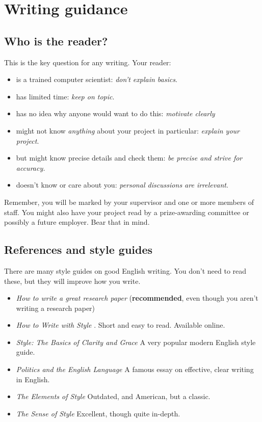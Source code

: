 \documentclass{l4proj}
\theoremstyle{definition}
\begin{document}
\section{Writing guidance}
\subsection{Who is the reader?}

This is the key question for any writing. Your reader:

\begin{itemize}
    \item
    is a trained computer scientist: \emph{don't explain basics}.
    \item
    has limited time: \emph{keep on topic}.
    \item
    has no idea why anyone would want to do this: \emph{motivate clearly}
    \item
    might not know \emph{anything} about your project in particular:
    \emph{explain your project}.
    \item
    but might know precise details and check them: \emph{be precise and
    strive for accuracy.}
    \item
    doesn't know or care about you: \emph{personal discussions are
    irrelevant}.
\end{itemize}

Remember, you will be marked by your supervisor and one or more members
of staff. You might also have your project read by a prize-awarding
committee or possibly a future employer. Bear that in mind.

\subsection{References and style guides}
There are many style guides on good English writing. You don't need to
read these, but they will improve how you write.

\begin{itemize}
    \item
    \emph{How to write a great research paper} \cite{Pey17} (\textbf{recommended}, even though you aren't writing a research paper)
    \item
    \emph{How to Write with Style} \cite{Von80}. Short and easy to read. Available online.
    \item
    \emph{Style: The Basics of Clarity and Grace} \cite{Wil09} A very popular modern English style guide.
    \item
    \emph{Politics and the English Language} \cite{Orw68}  A famous essay on effective, clear writing in English.
    \item
    \emph{The Elements of Style} \cite{StrWhi07} Outdated, and American, but a classic.
    \item
    \emph{The Sense of Style} \cite{Pin15} Excellent, though quite in-depth.
\end{itemize}
\end{document}
